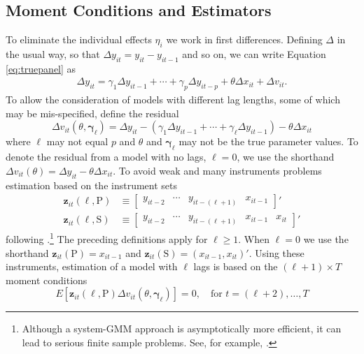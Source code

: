 \subsection{Moment Conditions and Estimators}
To eliminate the individual effects $\eta_i$ we work in first differences.
Defining $\Delta$ in the usual way, so that $\Delta y_{it} = y_{it} - y_{it-1}$ and so on, we can write Equation \ref{eq:truepanel} as
\begin{align}
  \Delta y_{it} = \gamma_1 \Delta y_{it-1} + \cdots + \gamma_p \Delta y_{it-p} + \theta \Delta x_{it} + \Delta v_{it}.
  \label{eq:truepaneldiff}
\end{align}
To allow the consideration of models with different lag lengths, some of which may be mis-specified, define the residual
\begin{equation}
  \Delta v_{it}\left(\theta, \boldsymbol{\gamma}_\ell \right) = \Delta y_{it} - \left(\gamma_1 \Delta y_{it-1} + \cdots + \gamma_\ell \Delta y_{it-1} \right) - \theta \Delta x_{it} 
  \label{eq:panelresidual}
\end{equation}
where $\ell$ may not equal $p$ and $\theta$ and $\boldsymbol{\gamma}_\ell$ may not be the true parameter values.
To denote the residual from a model with no lags, $\ell = 0$, we use the shorthand $\Delta v_{it}(\theta) = \Delta y_{it} - \theta \Delta x_{it}$.
To avoid weak and many instruments problems estimation based on the instrument sets
\begin{align}
  \mathbf{z}_{it}(\ell,\text{P}) &\equiv \left[
  \begin{array}{cccc}
    y_{it-2} & \cdots & y_{it-(\ell + 1)} & x_{it-1}
  \end{array}
\right]'
  \label{eq:ZdpanelP}
\\
\mathbf{z}_{it}(\ell, \text{S}) &\equiv \left[
\begin{array}{ccccc}
  y_{it-2} & \cdots & y_{it-(\ell + 1)} & x_{it-1} & x_{it}
\end{array}
\right]'
  \label{eq:ZdpanelS}
\end{align}
following \cite{AndersonHsiao}.\footnote{Although a system-GMM approach is asymptotically more efficient, it can lead to serious finite sample problems. See, for example, \cite{Roodman}.} 
The preceding definitions apply for $\ell \geq 1$. 
When $\ell = 0$ we use the shorthand $\mathbf{z}_{it}(\text{P}) = x_{it-1}$ and $\mathbf{z}_{it}(\text{S}) = (x_{it-1}, x_{it})'$.
Using these instruments, estimation of a model with $\ell$ lags is based on the $(\ell + 1)\times T$ moment conditions
\begin{equation}
  E\left[ \mathbf{z}_{it}(\ell,\mbox{P})\Delta v_{it}(\theta, \boldsymbol{\gamma}_\ell) \right] = 0, \quad \mbox{for } t = (\ell + 2),\dots, T
  \label{eq:MCdpanelP}
\end{equation}
